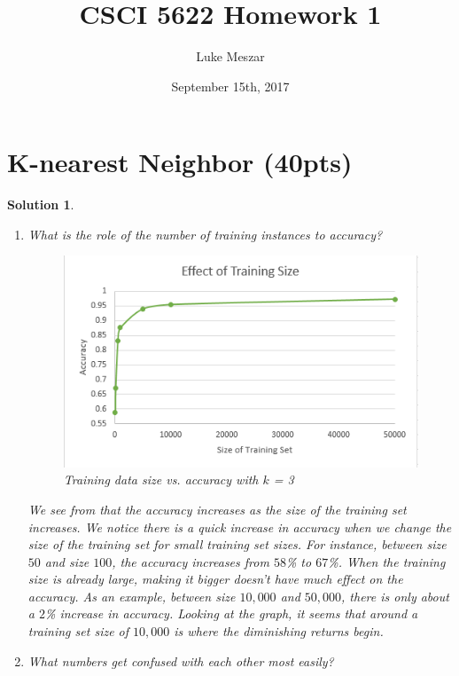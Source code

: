 \documentclass[12pt]{article}
\author{Luke Meszar}
\date{September 15th, 2017}
\title{CSCI 5622 Homework 1}
\newtheorem*{solution*}{Solution}
\theoremstyle{definition}
\begin{document}
	\thispagestyle{empty}
	
	\newlength{\boxlength}\setlength{\boxlength}{\textwidth}
	\addtolength{\boxlength}{-4mm}
	
	\begin{center}
	\end{center}
	\section{K-nearest Neighbor (40pts)}																																									
	\begin{solution*}\leavevmode
		\begin{enumerate}[label=\arabic*.,font=\upshape]
			\item \textnormal{What is the role of the number of training instances to accuracy? }
			\begin{figure}[H]
				\centering
				\includegraphics[scale=0.6]{AccuracyVsTrainingSize}
				\caption{Training data size vs. accuracy with $k$ = 3}
				\label{fig:sizevsaccuracy}
			\end{figure}
		
			We see from  that the accuracy increases as the size of the training set increases. We notice there is a quick increase in accuracy when we change the size of the training set for small training set sizes. For instance, between size $50$ and size $100$, the accuracy increases from $58$\% to $67$\%. When the training size is already large, making it bigger doesn't have much effect on the accuracy. As an example, between size $10,000$ and $50,000$, there is only about a $2$\% increase in accuracy. Looking at the graph, it seems that around a training set size of $10,000$ is where the diminishing returns begin.
			\item \textnormal{What numbers get confused with each other most easily?}
			

\end{enumerate}
\end{solution*}
\end{document}

